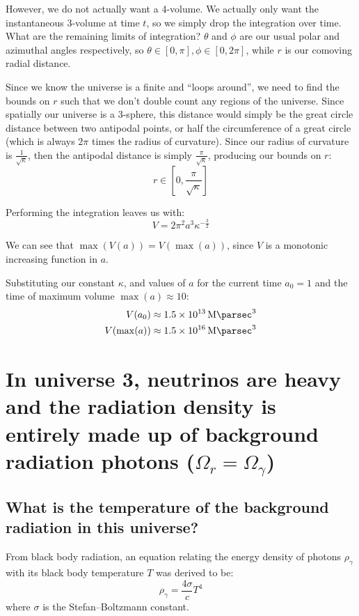 \documentclass[a4paper]{scrartcl}
\begin{document}
However, we do not actually want a 4-volume. We actually only want the instantaneous 3-volume at time \(t\), so we simply drop the integration over time. What are the remaining limits of integration? \(\theta\) and \(\phi\) are our usual polar and azimuthal angles respectively, so \(\theta \in [0, \pi], \phi \in [0, 2 \pi]\), while \(r\) is our comoving radial distance.

Since we know the universe is a finite and ``loops around'', we need to find the bounds on \(r\) such that we don't double count any regions of the universe. Since spatially our universe is a 3-sphere, this distance would simply be the great circle distance between two antipodal points, or half the circumference of a great circle (which is always \(2 \pi\) times the radius of curvature). Since our radius of curvature is \(\frac{1}{\sqrt{\kappa}}\), then the antipodal distance is simply \(\frac{\pi}{\sqrt{\kappa}}\), producing our bounds on \(r\):
\[r \in \left[0, \frac{\pi}{\sqrt{\kappa}}\right]\]

Performing the integration leaves us with:
\[V = 2 \pi^2 a^3 \kappa^{-\frac{3}{2}}\]

We can see that \(\max(V(a)) = V(\max(a))\), since \(V\) is a monotonic increasing function in \(a\).

Substituting our constant \(\kappa\), and values of \(a\) for the current time \(a_0 = 1\) and the time of maximum volume \(\max(a) \approx 10\):
\begin{align*}
    V(a_0) &\approx \SI{1.5e13}{\mega\parsec\cubed} \\
    V(\max(a)) &\approx \SI{1.5e16}{\mega\parsec\cubed}
\end{align*}

\section{In universe 3, neutrinos are heavy and the radiation density is entirely made up of background radiation photons (\(\Omega_r = \Omega_\gamma\))}
\subsection{What is the temperature of the background radiation in this universe?}
From black body radiation, an equation relating the energy density of photons \(\rho_\gamma\) with its black body temperature \(T\) was derived to be:
\[\rho_\gamma = \frac{4 \sigma}{c} T^4\]
where \(\sigma\) is the Stefan--Boltzmann constant.
\end{document}
